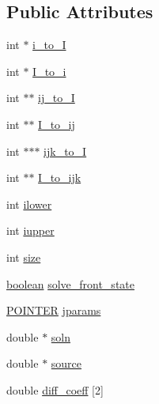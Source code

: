\subsection*{Public Attributes}
\begin{DoxyCompactItemize}
\item 
int $\ast$ \hyperlink{class_c_i_m___e_l_l_i_p_t_i_c___s_o_l_v_e_r_a4b93d2a6334ea7f427ad48b46d4d7892}{i\+\_\+to\+\_\+I}
\item 
int $\ast$ \hyperlink{class_c_i_m___e_l_l_i_p_t_i_c___s_o_l_v_e_r_aefa6eb1fb3b5e993d5963a1dac8e0ad9}{I\+\_\+to\+\_\+i}
\item 
int $\ast$$\ast$ \hyperlink{class_c_i_m___e_l_l_i_p_t_i_c___s_o_l_v_e_r_a4257a1de7947e24b2cab369817f4f61d}{ij\+\_\+to\+\_\+I}
\item 
int $\ast$$\ast$ \hyperlink{class_c_i_m___e_l_l_i_p_t_i_c___s_o_l_v_e_r_a8ea4a9942e70bc42fe25a7c719eff179}{I\+\_\+to\+\_\+ij}
\item 
int $\ast$$\ast$$\ast$ \hyperlink{class_c_i_m___e_l_l_i_p_t_i_c___s_o_l_v_e_r_a5ffbcced8cdc015074eda0f9f9d5f023}{ijk\+\_\+to\+\_\+I}
\item 
int $\ast$$\ast$ \hyperlink{class_c_i_m___e_l_l_i_p_t_i_c___s_o_l_v_e_r_a396d0a4b498df693f2009b1354168024}{I\+\_\+to\+\_\+ijk}
\item 
int \hyperlink{class_c_i_m___e_l_l_i_p_t_i_c___s_o_l_v_e_r_a85f9cba58f532adb3fd421a01bbcd8a3}{ilower}
\item 
int \hyperlink{class_c_i_m___e_l_l_i_p_t_i_c___s_o_l_v_e_r_acd32eea923654fe18ca6ad02af1af529}{iupper}
\item 
int \hyperlink{class_c_i_m___e_l_l_i_p_t_i_c___s_o_l_v_e_r_a4f5289e29cd20b93774584540c799123}{size}
\item 
\hyperlink{cdecs_8h_ad048433382a936258fb49e2ec4f148e1}{boolean} \hyperlink{class_c_i_m___e_l_l_i_p_t_i_c___s_o_l_v_e_r_a22fc992cc6d0a999de7c642b4ac942c0}{solve\+\_\+front\+\_\+state}
\item 
\hyperlink{cdecs_8h_ae51a81000f343b8ec43bca1f6a723d7b}{P\+O\+I\+N\+T\+ER} \hyperlink{class_c_i_m___e_l_l_i_p_t_i_c___s_o_l_v_e_r_ad5ac68a3ae751a21a4430d215f6d5632}{jparams}
\item 
double $\ast$ \hyperlink{class_c_i_m___e_l_l_i_p_t_i_c___s_o_l_v_e_r_a8dcbe825756677f5083625775f3d3517}{soln}
\item 
double $\ast$ \hyperlink{class_c_i_m___e_l_l_i_p_t_i_c___s_o_l_v_e_r_ad38c32acb256d193b1f0d040ac997122}{source}
\item 
double \hyperlink{class_c_i_m___e_l_l_i_p_t_i_c___s_o_l_v_e_r_a6743c4461e301f8c6643605f4bf5746d}{diff\+\_\+coeff} \mbox{[}2\mbox{]}
$$
\end{DoxyCompactItemize}
